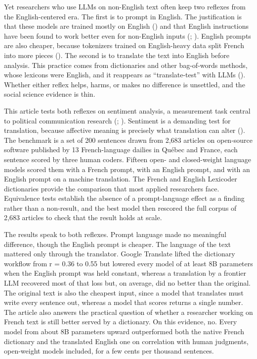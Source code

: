 \documentclass[
  man,
  floatsintext,
  longtable,
  nolmodern,
  notxfonts,
  notimes,
  colorlinks=true,linkcolor=blue,citecolor=blue,urlcolor=blue]{apa7}
\begin{document}
Yet researchers who use LLMs on non-English text often keep two reflexes
from the English-centered era. The first is to prompt in English. The
justification is that these models are trained mostly on English
() and that English
instructions have been found to work better even for non-English inputs
(;
). English prompts are
also cheaper, because tokenizers trained on English-heavy data split
French into more pieces (). The second is to translate the text into English before
analysis. This practice comes from dictionaries and other bag-of-words
methods, whose lexicons were English, and it reappears as
``translate-test'' with LLMs
(). Whether
either reflex helps, harms, or makes no difference is unsettled, and the
social science evidence is thin.

This article tests both reflexes on sentiment analysis, a measurement
task central to political communication research
(;
). Sentiment is a
demanding test for translation, because affective meaning is precisely
what translation can alter
(). The
benchmark is a set of 200 sentences drawn from 2,683 articles on
open-source software published by 13 French-language dailies in Québec
and France, each sentence scored by three human coders. Fifteen open-
and closed-weight language models scored them with a French prompt, with
an English prompt, and with an English prompt on a machine translation.
The French and English Lexicoder dictionaries provide the comparison
that most applied researchers face. Equivalence tests establish the
absence of a prompt-language effect as a finding rather than a
non-result, and the best model then rescored the full corpus of 2,683
articles to check that the result holds at scale.

The results speak to both reflexes. Prompt language made no meaningful
difference, though the English prompt is cheaper. The language of the
text mattered only through the translator. Google Translate lifted the
dictionary workflow from r = 0.36 to 0.55 but lowered every model of at
least 8B parameters when the English prompt was held constant, whereas a
translation by a frontier LLM recovered most of that loss but, on
average, did no better than the original. The original text is also the
cheapest input, since a model that translates must write every sentence
out, whereas a model that scores returns a single number. The article
also answers the practical question of whether a researcher working on
French text is still better served by a dictionary. On this evidence,
no. Every model from about 8B parameters upward outperformed both the
native French dictionary and the translated English one on correlation
with human judgments, open-weight models included, for a few cents per
thousand sentences.
\end{document}
